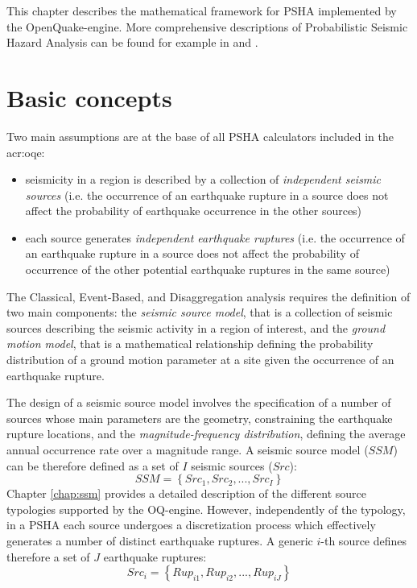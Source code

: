 This chapter describes the mathematical framework for PSHA implemented by 
the OpenQuake-engine. More comprehensive descriptions of Probabilistic Seismic
Hazard Analysis can be found for example in \textcite{mcguire2004} and 
\textcite{usnrc2012}. 

\section{Basic concepts}
Two main assumptions are at the base of all PSHA calculators included in the 
\gls{acr:oqe}:
\begin{itemize}
    \item seismicity in a region is described by a collection of
        \textit{independent seismic sources} (i.e. the occurrence of an
        earthquake rupture in a source does not affect the probability of
        earthquake occurrence in the other sources)
    \item each source generates \textit{independent earthquake ruptures} (i.e.
        the occurrence of an earthquake rupture in a source does not affect the
        probability of occurrence of the other potential earthquake ruptures in
        the same source)
\end{itemize}
%
The Classical, Event-Based, and Disaggregation analysis requires the definition
of two main components: the \textit{seismic source model}, that is a collection
of seismic sources describing the seismic activity in a region of interest, and
the \textit{ground motion model}, that is a mathematical relationship defining
the probability distribution of a ground motion parameter at a site given the
occurrence of an earthquake rupture.

The design of a seismic source model involves the specification of a number of
sources whose main parameters are the geometry, constraining the earthquake
rupture locations, and the \textit{magnitude-frequency distribution}, defining
the average annual occurrence rate over a magnitude range. A seismic source
model ($SSM$) can be therefore defined as a set of $I$ seismic sources
($Src$):
\begin{equation}
SSM = \left\{Src_{1}, Src_{2}, ..., Src_{I}\right\}
\end{equation}
Chapter \ref{chap:ssm} provides a detailed description of the different source
typologies supported by the OQ-engine. However, independently of the typology,
in a PSHA each source undergoes a discretization process which effectively
generates a number of distinct earthquake ruptures. A generic $i$-th source
defines therefore a set of $J$ earthquake ruptures:
\begin{equation}
Src_{i} = \left\{Rup_{i1}, Rup_{i2}, ..., Rup_{iJ}\right\}
\end{equation}

